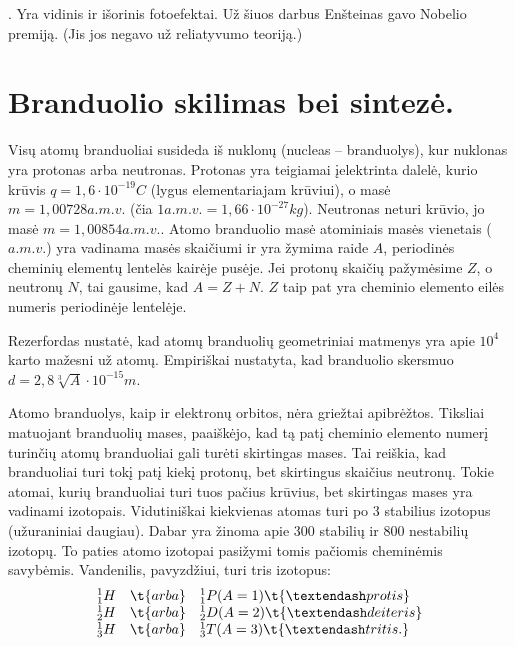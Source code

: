 .
Yra vidinis ir išorinis fotoefektai. Už šiuos darbus Enšteinas gavo
Nobelio premiją. (Jis jos negavo už reliatyvumo teoriją.)

\section{Branduolio skilimas bei sintezė.}

Visų atomų branduoliai susideda iš nuklonų (nucleas – branduolys),
kur nuklonas yra protonas arba neutronas. Protonas yra teigiamai
įelektrinta dalelė, kurio krūvis $q = 1,6 \cdot 10^{-19} C$ (lygus
elementariajam krūviui), o masė $m = 1,00728 a.m.v.$ (čia
$1 a.m.v. = 1,66\cdot 10^{-27}kg$). Neutronas neturi krūvio, jo
masė $m = 1,00854 a.m.v.$. Atomo branduolio masė atominiais masės
vienetais ($a.m.v.$) yra vadinama masės skaičiumi ir yra žymima
raide $A$, periodinės cheminių elementų lentelės kairėje pusėje.
Jei protonų skaičių pažymėsime $Z$, o neutronų $N$, tai gausime,
kad $A = Z + N$. $Z$ taip pat yra cheminio elemento eilės numeris
periodinėje lentelėje.

Rezerfordas nustatė, kad atomų branduolių geometriniai matmenys yra
apie $10^{4}$ karto mažesni už atomų. Empiriškai nustatyta, kad
branduolio skersmuo $d = 2,8\sqrt[3]{A} \cdot 10^{-15} m$.

Atomo branduolys, kaip ir elektronų orbitos, nėra griežtai
apibrėžtos. Tiksliai matuojant branduolių mases, paaiškėjo, kad tą
patį cheminio elemento numerį turinčių atomų  branduoliai gali
turėti skirtingas mases. Tai reiškia, kad branduoliai turi tokį patį
kiekį protonų, bet skirtingus skaičius neutronų. Tokie atomai,
kurių branduoliai turi tuos pačius krūvius, bet skirtingas mases yra
vadinami izotopais. Vidutiniškai kiekvienas atomas turi po 3 stabilius
izotopus (užuraniniai daugiau). Dabar yra žinoma apie 300 stabilių ir
800 nestabilių izotopų. To paties atomo izotopai pasižymi tomis pačiomis
cheminėmis savybėmis. Vandenilis, pavyzdžiui, turi tris izotopus:
\begin{equation*}
  \begin{array}[]{c c l}
    {}^{1}_{1}H & \t{arba} & {}^{1}_{1}P(A=1) \t{– protis} \\
    {}^{1}_{2}H & \t{arba} & {}^{1}_{2}D(A=2) \t{– deiteris} \\
    {}^{1}_{3}H & \t{arba} & {}^{1}_{3}T(A=3) \t{– tritis.} \\
  \end{array}
\end{equation*}

